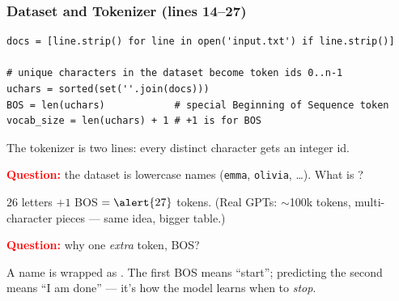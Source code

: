 \begin{frame}[fragile]
    \frametitle{Dataset and Tokenizer (lines 14--27)}

\begin{lstlisting}
docs = [line.strip() for line in open('input.txt') if line.strip()]

# unique characters in the dataset become token ids 0..n-1
uchars = sorted(set(''.join(docs)))
BOS = len(uchars)            # special Beginning of Sequence token
vocab_size = len(uchars) + 1 # +1 is for BOS
\end{lstlisting}

    The tokenizer is \alert{two lines}: every distinct character gets an integer id.

    \pause

    \textcolor{red}{\textbf{Question:}} the dataset is lowercase names (\texttt{emma}, \texttt{olivia}, \dots). What is ?

    \pause

    $26$ letters $+ 1$ BOS $= \alert{27}$ tokens. (Real GPTs: $\sim$100k tokens, multi-character pieces --- same idea, bigger table.)

    \pause

    \textcolor{red}{\textbf{Question:}} why one \emph{extra} token, BOS?

    \pause

    A name is wrapped as . The first BOS means \alert{``start''}; predicting the second means \alert{``I am done''} --- it's how the model learns when to \emph{stop}.
\end{frame}


